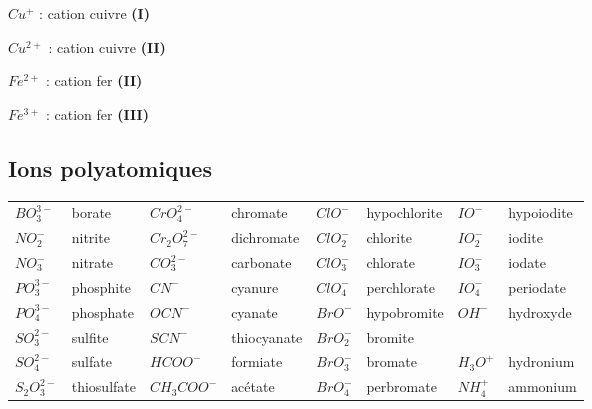 \documentclass[
  11pt,
  a4paper,
  openany]{book}
\begin{document}
\begin{multicols}{3}
\(Cu^+\) : cation cuivre \textbf{(I)}

\(Cu^{2+}\) : cation cuivre \textbf{(II)}

\(Fe^{2+}\) : cation fer \textbf{(II)}

\(Fe^{3+}\) : cation fer \textbf{(III)}

\end{multicols}

\subsection{Ions polyatomiques}\label{ions-polyatomiques}

\begin{longtable}[]{@{}
  >{\raggedright\arraybackslash}p{}
  >{\raggedright\arraybackslash}p{}
  >{\raggedright\arraybackslash}p{}
  >{\raggedright\arraybackslash}p{}
  >{\raggedright\arraybackslash}p{}
  >{\raggedright\arraybackslash}p{}
  >{\raggedright\arraybackslash}p{}
  >{\raggedright\arraybackslash}p{}@{}}
\toprule\noalign{}
\endhead
\bottomrule\noalign{}
\endlastfoot
\(BO_3^{3-}\) & borate & \(CrO_4^{2-}\) & chromate & \(ClO^{-}\) & hypochlorite & \(IO^{-}\) & hypoiodite \\
\(NO_2^{-}\) & nitrite & \(Cr_2O_7^{2-}\) & dichromate & \(ClO_2^{-}\) & chlorite & \(IO_2^{-}\) & iodite \\
\(NO_3^{-}\) & nitrate & \(CO_3^{2-}\) & carbonate & \(ClO_3^{-}\) & chlorate & \(IO_3^{-}\) & iodate \\
\(PO_3^{3-}\) & phosphite & \(CN^{-}\) & cyanure & \(ClO_4^{-}\) & perchlorate & \(IO_4^{-}\) & periodate \\
\(PO_4^{3-}\) & phosphate & \(OCN^{-}\) & cyanate & \(BrO^{-}\) & hypobromite & \(OH^{-}\) & hydroxyde \\
\(SO_3^{2-}\) & sulfite & \(SCN^{-}\) & thiocyanate & \(BrO_2^{-}\) & bromite & & \\
\(SO_4^{2-}\) & sulfate & \(HCOO^{-}\) & formiate & \(BrO_3^{-}\) & bromate & \(H_3O^{+}\) & hydronium \\
\(S_2O_3^{2-}\) & thiosulfate & \(CH_3COO^{-}\) & acétate & \(BrO_4^{-}\) & perbromate & \(NH_4^{+}\) & ammonium \\
\end{longtable}
\end{document}
